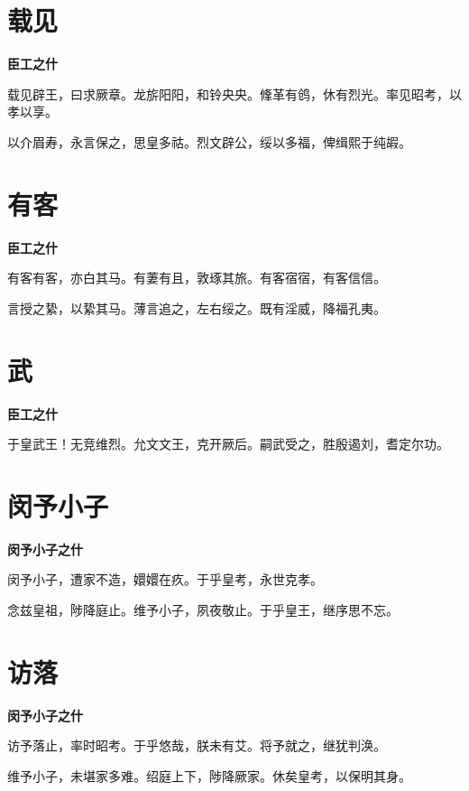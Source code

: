 \documentclass[12pt,a4paper]{ctexbook}
\begin{document}
\section{载见}
\textbf{臣工之什}\par\vspace{0.5em}
载见辟王，曰求厥章。龙旂阳阳，和铃央央。鞗革有鸧，休有烈光。率见昭考，以孝以享。\par
以介眉寿，永言保之，思皇多祜。烈文辟公，绥以多福，俾缉熙于纯嘏。\par

\section{有客}
\textbf{臣工之什}\par\vspace{0.5em}
有客有客，亦白其马。有萋有且，敦琢其旅。有客宿宿，有客信信。\par
言授之絷，以絷其马。薄言追之，左右绥之。既有淫威，降福孔夷。\par

\section{武}
\textbf{臣工之什}\par\vspace{0.5em}
于皇武王！无竞维烈。允文文王，克开厥后。嗣武受之，胜殷遏刘，耆定尔功。\par

\section{闵予小子}
\textbf{闵予小子之什}\par\vspace{0.5em}
闵予小子，遭家不造，嬛嬛在疚。于乎皇考，永世克孝。\par
念兹皇祖，陟降庭止。维予小子，夙夜敬止。于乎皇王，继序思不忘。\par

\section{访落}
\textbf{闵予小子之什}\par\vspace{0.5em}
访予落止，率时昭考。于乎悠哉，朕未有艾。将予就之，继犹判涣。\par
维予小子，未堪家多难。绍庭上下，陟降厥家。休矣皇考，以保明其身。\par
\end{document}
